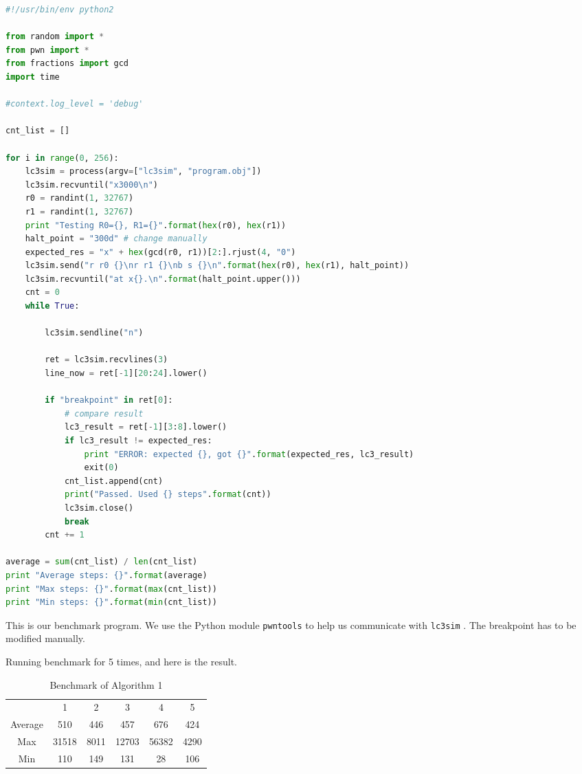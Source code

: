 \documentclass{article}
\begin{document}
	\begin{lstlisting}[language=Python, caption={Benchmark Python program}]
#!/usr/bin/env python2

from random import *
from pwn import *
from fractions import gcd
import time

#context.log_level = 'debug'

cnt_list = []

for i in range(0, 256):
    lc3sim = process(argv=["lc3sim", "program.obj"])
    lc3sim.recvuntil("x3000\n")
    r0 = randint(1, 32767)
    r1 = randint(1, 32767)
    print "Testing R0={}, R1={}".format(hex(r0), hex(r1))
    halt_point = "300d" # change manually
    expected_res = "x" + hex(gcd(r0, r1))[2:].rjust(4, "0")
    lc3sim.send("r r0 {}\nr r1 {}\nb s {}\n".format(hex(r0), hex(r1), halt_point))
    lc3sim.recvuntil("at x{}.\n".format(halt_point.upper()))
    cnt = 0
    while True:

        lc3sim.sendline("n")

        ret = lc3sim.recvlines(3)
        line_now = ret[-1][20:24].lower()

        if "breakpoint" in ret[0]:
            # compare result
            lc3_result = ret[-1][3:8].lower()
            if lc3_result != expected_res:
                print "ERROR: expected {}, got {}".format(expected_res, lc3_result)
                exit(0)
            cnt_list.append(cnt)
            print("Passed. Used {} steps".format(cnt))
            lc3sim.close()
            break
        cnt += 1

average = sum(cnt_list) / len(cnt_list)
print "Average steps: {}".format(average)
print "Max steps: {}".format(max(cnt_list))
print "Min steps: {}".format(min(cnt_list))

	\end{lstlisting}
	
	This is our benchmark program. We use the Python module \texttt{pwntools} to help us communicate with \texttt{lc3sim} . The breakpoint has to be modified manually.
	
	Running benchmark for 5 times, and here is the result.
	
	\begin{table}[h]
	\centering
	\begin{tabular}{cccccc}
	        & 1     & 2    & 3     & 4      & 5     \\
	Average & 510   & 446  & 457   & 676    & 424   \\
	Max     & 31518 & 8011 & 12703 & 56382 & 4290 \\
	Min     & 110    & 149  & 131   & 28     & 106  
	\end{tabular}
	\caption{Benchmark of Algorithm 1}
	\end{table}
	
\end{document}
